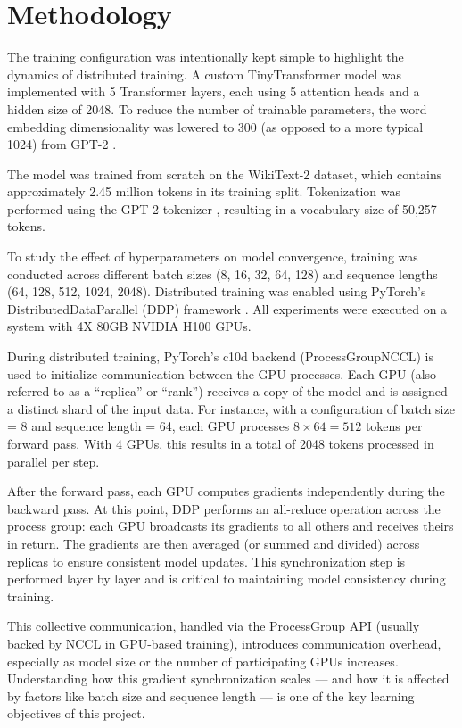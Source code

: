 \documentclass[conference]{IEEEtran}
\begin{document}
\section{Methodology}

The training configuration was intentionally kept simple to highlight the dynamics of distributed training. A custom TinyTransformer model was implemented with 5 Transformer layers, each using 5 attention heads and a hidden size of 2048. To reduce the number of trainable parameters, the word embedding dimensionality was lowered to 300 (as opposed to a more typical 1024) from GPT-2 \cite{radford2019language}.

The model was trained from scratch on the WikiText-2 \cite{merity2016pointer} dataset, which contains approximately 2.45 million tokens in its training split. Tokenization was performed using the GPT-2 tokenizer \cite{Wolf_Transformers_State-of-the-Art_Natural_2020}, resulting in a vocabulary size of 50,257 tokens.

To study the effect of hyperparameters on model convergence, training was conducted across different batch sizes (8, 16, 32, 64, 128) and sequence lengths (64, 128, 512, 1024, 2048). Distributed training was enabled using PyTorch's DistributedDataParallel (DDP) framework \cite{Ansel_PyTorch_2_Faster_2024}. All experiments were executed on a system with 4X 80GB NVIDIA H100 GPUs.

During distributed training, PyTorch's c10d backend (ProcessGroupNCCL) is used to initialize communication between the GPU processes. Each GPU (also referred to as a “replica” or “rank”) receives a copy of the model and is assigned a distinct shard of the input data. For instance, with a configuration of batch size = 8 and sequence length = 64, each GPU processes $8 \times 64 = 512$ tokens per forward pass. With 4 GPUs, this results in a total of 2048 tokens processed in parallel per step.

After the forward pass, each GPU computes gradients independently during the backward pass. At this point, DDP performs an all-reduce operation across the process group: each GPU broadcasts its gradients to all others and receives theirs in return. The gradients are then averaged (or summed and divided) across replicas to ensure consistent model updates. This synchronization step is performed layer by layer and is critical to maintaining model consistency during training.

This collective communication, handled via the ProcessGroup API (usually backed by NCCL in GPU-based training), introduces communication overhead, especially as model size or the number of participating GPUs increases. Understanding how this gradient synchronization scales — and how it is affected by factors like batch size and sequence length — is one of the key learning objectives of this project.
\end{document}
